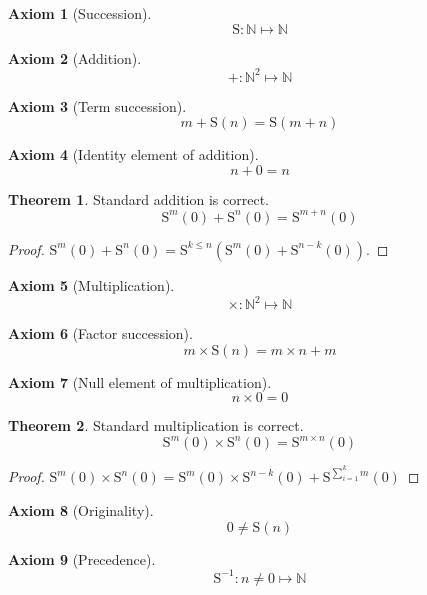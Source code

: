 \documentclass{amsbook}
\theoremstyle{definition}
\newtheorem{axm}{Axiom}[chapter]
\newtheorem{thm}{Theorem}[section]
\begin{document}
\newcommand{\suc}{\mathrm S}


\begin{axm}[Succession]
    $$\mathrm S: \mathbb N \longmapsto \mathbb N$$
\end{axm}

\begin{axm}[Addition]
    $$+: \mathbb N^2 \longmapsto \mathbb N$$
\end{axm}

\begin{axm}[Term succession]
    $$m + \mathrm S(n) = \mathrm S(m + n)$$
\end{axm}

\begin{axm}[Identity element of addition]
    $$n + 0 = n$$
\end{axm}

\begin{thm}
    Standard addition is correct.
    $$\suc^m(0) + \suc^n(0) = \suc^{m+n}(0)$$
    \begin{proof}
        $\suc^m(0) + \suc^n(0) = \suc^{k \leq n}(\suc^m(0) + \suc^{n-k}(0))$.
    \end{proof}
\end{thm}

\begin{axm}[Multiplication]
    $$\times: \mathbb N^2 \longmapsto \mathbb N$$
\end{axm}

\begin{axm}[Factor succession]
    $$m \times \mathrm S(n) = m \times n + m$$
\end{axm}

\begin{axm}[Null element of multiplication]
    $$n \times 0 = 0$$
\end{axm}

\begin{thm}
    Standard multiplication is correct.
    $$\suc^m(0) \times \suc^n(0) = \suc^{m \times n}(0)$$
    \begin{proof}
        $\suc^m(0) \times \suc^n(0) = \suc^m(0) \times \suc^{n-k}(0) + \suc^{\sum_{i=1}^{k} m}(0)$
    \end{proof}
\end{thm}

\begin{axm}[Originality]
    $$0 \neq \suc(n)$$
\end{axm}

\begin{axm}[Precedence]
    $$\mathrm S^{-1}: n \neq 0 \longmapsto \mathbb N$$
\end{axm}
\end{document}
